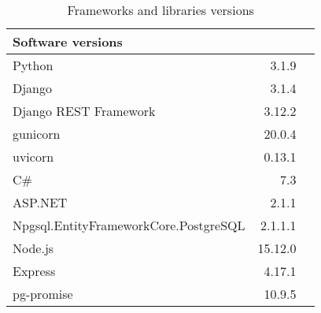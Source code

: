 \begin{table}[!htp]\centering
    \caption{Frameworks and libraries versions}\label{tab:software}
    \scriptsize
    \begin{tabular}{lrr}\toprule
        Software versions                     &         \\\midrule
        Python                                & 3.1.9   \\
        Django                                & 3.1.4   \\
        Django REST Framework                 & 3.12.2  \\
        gunicorn                              & 20.0.4  \\
        uvicorn                               & 0.13.1  \\\midrule
        C\#                                   & 7.3     \\
        ASP.NET                               & 2.1.1   \\
        Npgsql.EntityFrameworkCore.PostgreSQL & 2.1.1.1 \\\midrule
        Node.js                               & 15.12.0 \\\midrule
        Express                               & 4.17.1  \\
        pg-promise                            & 10.9.5  \\
        \bottomrule
    \end{tabular}
\end{table}
